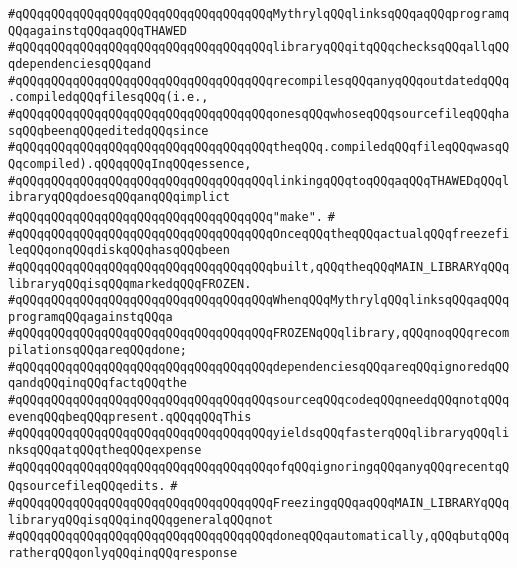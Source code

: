 \verb|#qQQqqQQqqQQqqQQqqQQqqQQqqQQqqQQqqQQqMythrylqQQqlinksqQQqaqQQqprogramqQQqagainstqQQqaqQQqTHAWED|\newline
\verb|#qQQqqQQqqQQqqQQqqQQqqQQqqQQqqQQqqQQqlibraryqQQqitqQQqchecksqQQqallqQQqdependenciesqQQqand|\newline
\verb|#qQQqqQQqqQQqqQQqqQQqqQQqqQQqqQQqqQQqrecompilesqQQqanyqQQqoutdatedqQQq.compiledqQQqfilesqQQq(i.e.,|\newline
\verb|#qQQqqQQqqQQqqQQqqQQqqQQqqQQqqQQqqQQqonesqQQqwhoseqQQqsourcefileqQQqhasqQQqbeenqQQqeditedqQQqsince|\newline
\verb|#qQQqqQQqqQQqqQQqqQQqqQQqqQQqqQQqqQQqtheqQQq.compiledqQQqfileqQQqwasqQQqcompiled).qQQqqQQqInqQQqessence,|\newline
\verb|#qQQqqQQqqQQqqQQqqQQqqQQqqQQqqQQqqQQqlinkingqQQqtoqQQqaqQQqTHAWEDqQQqlibraryqQQqdoesqQQqanqQQqimplict|\newline
\verb|#qQQqqQQqqQQqqQQqqQQqqQQqqQQqqQQqqQQq"make".|\newline
\verb|#|\newline
\verb|#qQQqqQQqqQQqqQQqqQQqqQQqqQQqqQQqqQQqOnceqQQqtheqQQqactualqQQqfreezefileqQQqonqQQqdiskqQQqhasqQQqbeen|\newline
\verb|#qQQqqQQqqQQqqQQqqQQqqQQqqQQqqQQqqQQqbuilt,qQQqtheqQQqMAIN_LIBRARYqQQqlibraryqQQqisqQQqmarkedqQQqFROZEN.|\newline
\verb|#qQQqqQQqqQQqqQQqqQQqqQQqqQQqqQQqqQQqWhenqQQqMythrylqQQqlinksqQQqaqQQqprogramqQQqagainstqQQqa|\newline
\verb|#qQQqqQQqqQQqqQQqqQQqqQQqqQQqqQQqqQQqFROZENqQQqlibrary,qQQqnoqQQqrecompilationsqQQqareqQQqdone;|\newline
\verb|#qQQqqQQqqQQqqQQqqQQqqQQqqQQqqQQqqQQqdependenciesqQQqareqQQqignoredqQQqandqQQqinqQQqfactqQQqthe|\newline
\verb|#qQQqqQQqqQQqqQQqqQQqqQQqqQQqqQQqqQQqsourceqQQqcodeqQQqneedqQQqnotqQQqevenqQQqbeqQQqpresent.qQQqqQQqThis|\newline
\verb|#qQQqqQQqqQQqqQQqqQQqqQQqqQQqqQQqqQQqyieldsqQQqfasterqQQqlibraryqQQqlinksqQQqatqQQqtheqQQqexpense|\newline
\verb|#qQQqqQQqqQQqqQQqqQQqqQQqqQQqqQQqqQQqofqQQqignoringqQQqanyqQQqrecentqQQqsourcefileqQQqedits.|\newline
\verb|#|\newline
\verb|#qQQqqQQqqQQqqQQqqQQqqQQqqQQqqQQqqQQqFreezingqQQqaqQQqMAIN_LIBRARYqQQqlibraryqQQqisqQQqinqQQqgeneralqQQqnot|\newline
\verb|#qQQqqQQqqQQqqQQqqQQqqQQqqQQqqQQqqQQqdoneqQQqautomatically,qQQqbutqQQqratherqQQqonlyqQQqinqQQqresponse|\newline

